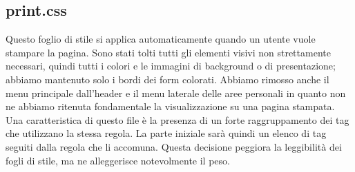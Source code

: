 	\subsection{print.css}
	Questo foglio di stile si applica automaticamente quando un utente vuole
stampare la pagina. Sono stati tolti tutti gli elementi visivi non strettamente necessari, quindi tutti i colori e le immagini di background o di presentazione; abbiamo mantenuto solo i bordi dei form colorati. Abbiamo rimosso anche il menu principale dall'header e il menu laterale delle aree personali in quanto non ne abbiamo ritenuta fondamentale la visualizzazione su una pagina stampata. Una caratteristica di questo file è la presenza di un forte raggruppamento dei tag che utilizzano la stessa regola. La parte iniziale sarà quindi un elenco di tag seguiti dalla regola che li accomuna. Questa decisione peggiora la leggibilità dei fogli di stile, ma ne alleggerisce notevolmente il peso.





